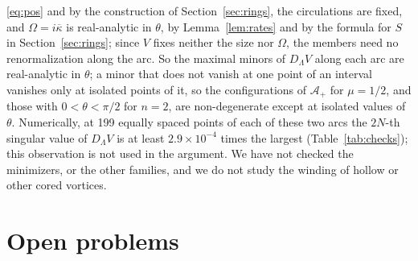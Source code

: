 \documentclass[11pt]{article}
\theoremstyle{definition}
\newcommand{\Ap}{\mathcal{A}_+}
\begin{document}
\eqref{eq:pos} and by the construction of Section~\ref{sec:rings}, the circulations are fixed, and $\Omega = i\overline{\kappa}$ is real-analytic in $\theta$, by Lemma~\ref{lem:rates} and by the formula for $S$ in Section~\ref{sec:rings}; since $V$ fixes neither the size nor $\Omega$, the members need no renormalization along the arc. So the maximal minors of $D_\Lambda V$ along each arc are real-analytic in $\theta$; a minor that does not vanish at one point of an interval vanishes only at isolated points of it, so the configurations of $\Ap$ for $\mu = 1/2$, and those with $0 < \theta < \pi/2$ for $n = 2$, are non-degenerate except at isolated values of $\theta$. Numerically, at 199 equally spaced points of each of these two arcs the $2N$-th singular value of $D_\Lambda V$ is at least $2.9 \times 10^{-4}$ times the largest (Table~\ref{tab:checks}); this observation is not used in the argument. We have not checked the minimizers, or the other families, and we do not study the winding of hollow or other cored vortices.

\section{Open problems}\label{sec:open}
\end{document}

